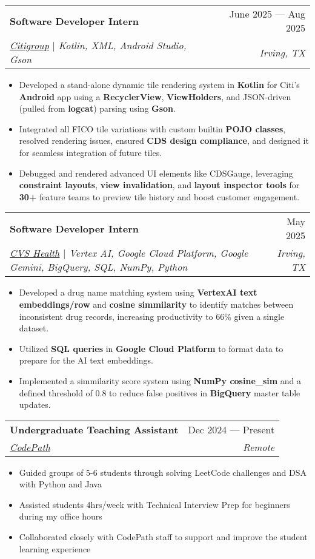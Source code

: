 \documentclass[letterpaper,11pt]{article}
\makeatletter
\newcommand{\resumeItem}[1]{
  \item\small{
    {#1 \vspace{-2pt}}
  }
}
\newcommand{\resumeSubheading}[4]{
  \vspace{-2pt}\item
    \begin{tabular*}{0.97\textwidth}[t]{l@{\extracolsep{\fill}}r}
      \textbf{#1} & #2 \\
      \textit{\small#3} & \textit{\small #4} \\
    \end{tabular*}\vspace{-7pt}
}
\newcommand{\resumeItemListStart}{\begin{itemize}}
\newcommand{\resumeItemListEnd}{\end{itemize}\vspace{-5pt}}
\makeatother
\begin{document}
    \resumeSubheading
      {Software Developer Intern}{June 2025 — Aug 2025}
      {\href{https://www.citigroup.com/global}{\underline{Citigroup}} $|$ \textit{Kotlin}, \textit{XML}, \textit{Android Studio}, \textit{Gson}}{Irving, TX}
      \resumeItemListStart
        \resumeItem{Developed a stand-alone dynamic tile rendering system in {\textbf{Kotlin}} for Citi's {\textbf{Android}} app using a {\textbf{RecyclerView}}, {\textbf{ViewHolders}}, and JSON-driven (pulled from {\textbf{logcat}}) parsing using {\textbf{Gson}}.}
        \resumeItem{Integrated all FICO tile variations with custom builtin {\textbf{POJO classes}}, resolved rendering issues, ensured {\textbf{CDS design compliance}}, and designed it for seamless integration of future tiles.}
        \resumeItem{Debugged and rendered advanced UI elements like CDSGauge, leveraging {\textbf{constraint layouts}}, {\textbf{view invalidation}}, and {\textbf{layout inspector tools}} for {\textbf{30+}} feature teams to preview tile history and boost customer engagement.}
    \resumeItemListEnd

    \resumeSubheading
      {Software Developer Intern}{May 2025}
      {\href{https://www.cvshealth.com/}{\underline{CVS Health}} $|$ \textit{Vertex AI}, \textit{Google Cloud Platform}, \textit{Google Gemini}, \textit{BigQuery}, \textit{SQL}, \textit{NumPy}, \textit{Python}}{Irving, TX}
      \resumeItemListStart
        \resumeItem{Developed a drug name matching system using {\textbf{VertexAI text embeddings/row}} and {\textbf{cosine simmilarity}} to identify matches between inconsistent drug records, increasing productivity to 66\% given a single dataset.}
        \resumeItem{Utilized {\textbf{SQL queries}} in {\textbf{Google Cloud Platform}} to format data to prepare for the AI text embeddings.}
        \resumeItem{Implemented a simmilarity score system using {\textbf{NumPy cosine\_sim}} and a defined threshold of 0.8 to reduce false positives in {\textbf{BigQuery}} master table updates.}
        
    \resumeItemListEnd

    \resumeSubheading
      {Undergraduate Teaching Assistant}{Dec 2024 — Present}
      {\href{https://www.codepath.org/}{\underline{CodePath}}}{Remote}
      \resumeItemListStart
        \resumeItem{Guided groups of 5-6 students through solving LeetCode challenges and DSA with Python and Java}
        \resumeItem{Assisted students 4hrs/week with Technical Interview Prep for beginners during my office hours}
        \resumeItem{Collaborated closely with CodePath staff to support and improve the student learning experience}
      \resumeItemListEnd
\end{document}
